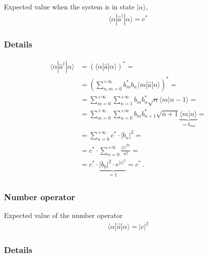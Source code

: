\documentclass[letterpaper,10pt,english]{jupyterBook}
\begin{document}
\sphinxAtStartPar
Expected value when the system is in state \(| \alpha \rangle\),
\begin{equation*}
\begin{split}\langle \alpha | \hat{a}^\dagger | \alpha \rangle = c^* \end{split}
\end{equation*}\subsubsection*{Details}
\begin{equation*}
\begin{split}\begin{aligned}
  \langle \alpha | \hat{a}^\dagger | \alpha \rangle 
  & = \left( \langle \alpha | \hat{a} | \alpha \rangle \right)^* = \\
  & = \left( \sum_{n,m=0}^{+\infty} b_m^* b_n \langle m | \hat{a} | n \rangle \right)^* = \\
  & = \sum_{m=0}^{+\infty} \sum_{n=1}^{+\infty} b_m b_n^* \sqrt{n} \langle m | n - 1 \rangle = \\
  & = \sum_{m=0}^{+\infty} \sum_{n=0}^{+\infty} b_m b_{n+1}^* \sqrt{n+1} \underbrace{\langle m | n \rangle}_{=\delta_{mn}} = \\
  & = \sum_{n=0}^{+\infty} c^* \cdot |b_n|^2 = \\
  & = c^* \cdot \sum_{n=0}^{+\infty} \frac{|c|^{2n}}{n!} = \\
  & = c^* \cdot \underbrace{|b_0|^2 \cdot e^{|c|^2}}_{=1}  = c^* \ .
\end{aligned}\end{split}
\end{equation*}\subsubsection*{Number operator}

\sphinxAtStartPar
Expected value of the number operator
\begin{equation*}
\begin{split}
  \langle \alpha | \hat{n} | \alpha \rangle = |c|^2
\end{split}
\end{equation*}\subsubsection*{Details}
\end{document}
